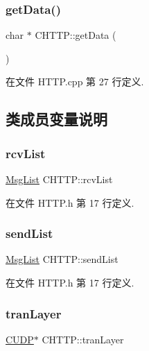 \subsubsection{\texorpdfstring{get\+Data()}{getData()}}
{\footnotesize\ttfamily char $\ast$ C\+H\+T\+T\+P\+::get\+Data (\begin{DoxyParamCaption}{ }\end{DoxyParamCaption})}



在文件 H\+T\+T\+P.\+cpp 第 27 行定义.



\subsection{类成员变量说明}
\mbox{\label{class_c_h_t_t_p_a86395cb3e64e45d31fda86b8e2ebf9dc}} 
\subsubsection{\texorpdfstring{rcv\+List}{rcvList}}
{\footnotesize\ttfamily \hyperlink{class_msg_list}{Msg\+List} C\+H\+T\+T\+P\+::rcv\+List}



在文件 H\+T\+T\+P.\+h 第 17 行定义.

\mbox{\label{class_c_h_t_t_p_a8cf28a01350c98fe3e4cbf4920da25c5}} 
\subsubsection{\texorpdfstring{send\+List}{sendList}}
{\footnotesize\ttfamily \hyperlink{class_msg_list}{Msg\+List} C\+H\+T\+T\+P\+::send\+List}



在文件 H\+T\+T\+P.\+h 第 17 行定义.

\mbox{\label{class_c_h_t_t_p_a0732dddaf54fa24a1554e566fcfa4eef}} 
\subsubsection{\texorpdfstring{tran\+Layer}{tranLayer}}
{\footnotesize\ttfamily \hyperlink{class_c_u_d_p}{C\+U\+DP}$\ast$ C\+H\+T\+T\+P\+::tran\+Layer}



